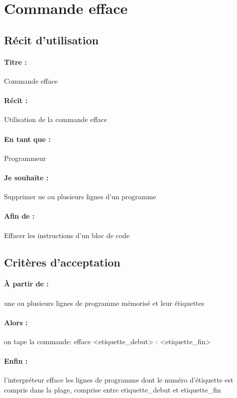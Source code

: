 \section{Commande efface}

    \subsection*{Récit d'utilisation}

    \paragraph{Titre : } Commande efface
    \paragraph{Récit : } Utilisation de la commande efface
    \paragraph{En tant que : } Programmeur
    \paragraph{Je souhaite : } Supprimer ue ou plusieurs lignes d'un programme
    \paragraph{Afin de : } Effacer les instructions d'un bloc de code

    \subsection*{Critères d'acceptation}

    \paragraph{À partir de : } une ou plusieurs lignes de programme mémorisé et leur étiquettes
    \paragraph{Alors : } on tape la commande: efface <etiquette\_debut> : <etiquette\_fin>
    \paragraph{Enfin : } l'interpréteur efface les lignes de programme dont le numéro d'étiquette est compris dans la plage, comprise entre etiquette\_debut et etiquette\_fin
